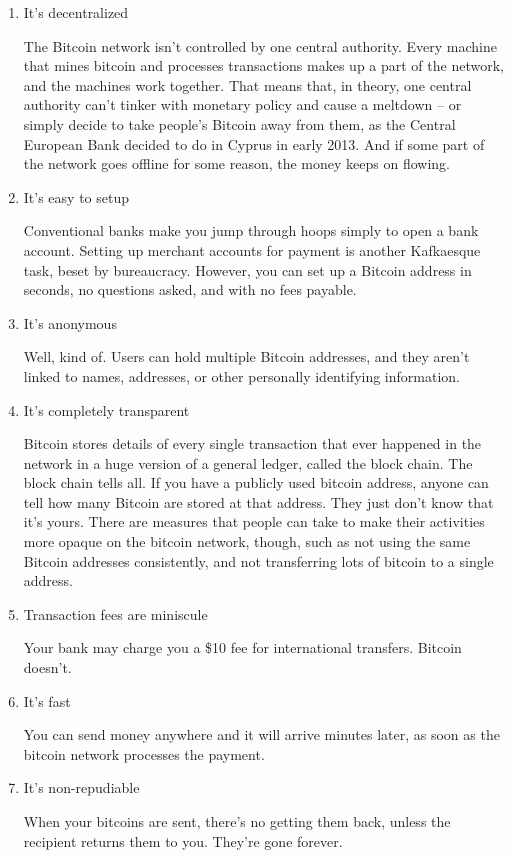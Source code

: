 \begin{enumerate}
	\item It’s decentralized
	
	The Bitcoin network isn’t controlled by one central authority. Every machine that mines bitcoin and
	processes transactions makes up a part of the network, and the machines work together. That means that, 
	in theory, one central authority can’t tinker with monetary policy and cause a meltdown – or simply 
	decide to take people’s Bitcoin away from them, as the Central European Bank decided to do in Cyprus in 
	early 2013. And if some part of the network goes offline for some reason, the money keeps on flowing\cite{nakamoto2012bitcoin}.
	\item It's easy to setup

	Conventional banks make you jump through hoops simply to open a bank account. Setting up merchant
	accounts for payment is another Kafkaesque task, beset by bureaucracy. However, you can set up a
	Bitcoin address in seconds, no questions asked, and with no fees payable\cite{nakamoto2012bitcoin}.

	\item It's anonymous

	Well, kind of. Users can hold multiple Bitcoin addresses, and they aren’t linked to names, addresses, or
	other personally identifying information.

	\item It's completely transparent

	Bitcoin stores details of every single transaction that ever happened in the network in a huge version 
	of a general ledger, called the block chain. The block chain tells all. If you have a publicly used bitcoin
	address, anyone can tell how many Bitcoin are stored at that address. They just don’t know that it’s yours.
	There are measures that people can take to make their activities more opaque on the bitcoin network,
	though, such as not using the same Bitcoin addresses consistently, and not transferring lots of bitcoin to a
	single address\cite{nakamoto2012bitcoin}.

	\item Transaction fees are miniscule

	Your bank may charge you a \$10 fee for international transfers. Bitcoin doesn’t.

	\item It's fast

	You can send money anywhere and it will arrive minutes later, as soon as the bitcoin network processes
	the payment.

	\item It's non-repudiable

	When your bitcoins are sent, there’s no getting them back, unless the recipient returns them to you.
	They’re gone forever.
\end{enumerate}

